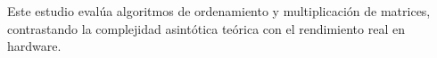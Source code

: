 Este estudio evalúa algoritmos de ordenamiento y multiplicación de matrices, contrastando la complejidad asintótica teórica con el rendimiento real en hardware.
